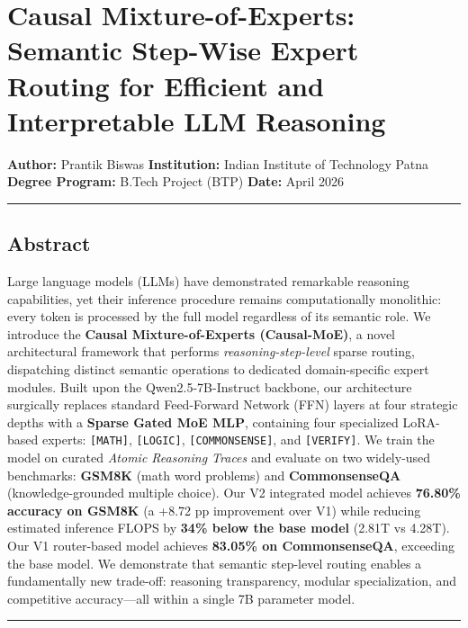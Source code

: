 \section{Causal Mixture-of-Experts: Semantic Step-Wise Expert Routing
for Efficient and Interpretable LLM
Reasoning}\label{causal-mixture-of-experts-semantic-step-wise-expert-routing-for-efficient-and-interpretable-llm-reasoning}

\textbf{Author:} Prantik Biswas \textbf{Institution:} Indian Institute
of Technology Patna \textbf{Degree Program:} B.Tech Project (BTP)
\textbf{Date:} April 2026

\begin{center}\rule{0.5\linewidth}{0.5pt}\end{center}

\subsection{Abstract}\label{abstract}

Large language models (LLMs) have demonstrated remarkable reasoning
capabilities, yet their inference procedure remains computationally
monolithic: every token is processed by the full model regardless of its
semantic role. We introduce the \textbf{Causal Mixture-of-Experts
(Causal-MoE)}, a novel architectural framework that performs
\emph{reasoning-step-level} sparse routing, dispatching distinct
semantic operations to dedicated domain-specific expert modules. Built
upon the Qwen2.5-7B-Instruct backbone, our architecture surgically
replaces standard Feed-Forward Network (FFN) layers at four strategic
depths with a \textbf{Sparse Gated MoE MLP}, containing four specialized
LoRA-based experts: \texttt{{[}MATH{]}}, \texttt{{[}LOGIC{]}},
\texttt{{[}COMMONSENSE{]}}, and \texttt{{[}VERIFY{]}}. We train the
model on curated \emph{Atomic Reasoning Traces} and evaluate on two
widely-used benchmarks: \textbf{GSM8K} (math word problems) and
\textbf{CommonsenseQA} (knowledge-grounded multiple choice). Our V2
integrated model achieves \textbf{76.80\% accuracy on GSM8K} (a +8.72 pp
improvement over V1) while reducing estimated inference FLOPS by
\textbf{34\% below the base model} (2.81T vs 4.28T). Our V1 router-based
model achieves \textbf{83.05\% on CommonsenseQA}, exceeding the base
model. We demonstrate that semantic step-level routing enables a
fundamentally new trade-off: reasoning transparency, modular
specialization, and competitive accuracy---all within a single 7B
parameter model.

\begin{center}\rule{0.5\linewidth}{0.5pt}\end{center}

